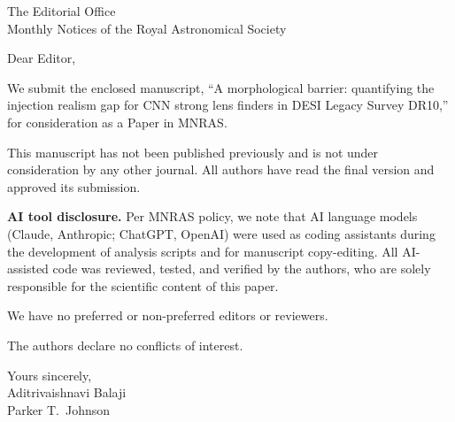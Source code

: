 \documentclass[11pt]{letter}
\date{25 May 2026}
\begin{document}
\begin{letter}{The Editorial Office \\
Monthly Notices of the Royal Astronomical Society}

\opening{Dear Editor,}

We submit the enclosed manuscript, ``A morphological barrier: quantifying
the injection realism gap for CNN strong lens finders in DESI Legacy
Survey DR10,'' for consideration as a Paper in MNRAS.

This manuscript has not been published previously and is not under
consideration by any other journal.  All authors have read the final
version and approved its submission.

\medskip
\noindent\textbf{AI tool disclosure.}
Per MNRAS policy, we note that AI language models (Claude, Anthropic;
ChatGPT, OpenAI) were used as coding assistants during the development
of analysis scripts and for manuscript copy-editing.  All AI-assisted
code was reviewed, tested, and verified by the authors, who are solely
responsible for the scientific content of this paper.

\medskip
We have no preferred or non-preferred editors or reviewers.

\medskip
\noindent The authors declare no conflicts of interest.

\bigskip
\noindent Yours sincerely,\\[6pt]
Aditrivaishnavi Balaji\\
Parker T.\ Johnson

\end{letter}
\end{document}
